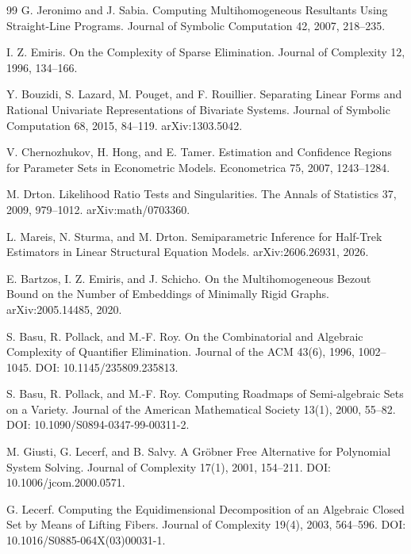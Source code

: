 \documentclass{article}
\begin{document}
\begin{thebibliography}{99}
   G. Jeronimo and J. Sabia. Computing Multihomogeneous Resultants Using Straight-Line Programs. Journal of Symbolic Computation 42, 2007, 218--235.

   I. Z. Emiris. On the Complexity of Sparse Elimination. Journal of Complexity 12, 1996, 134--166.

   Y. Bouzidi, S. Lazard, M. Pouget, and F. Rouillier. Separating Linear Forms and Rational Univariate Representations of Bivariate Systems. Journal of Symbolic Computation 68, 2015, 84--119. arXiv:1303.5042.

   V. Chernozhukov, H. Hong, and E. Tamer. Estimation and Confidence Regions for Parameter Sets in Econometric Models. Econometrica 75, 2007, 1243--1284.

   M. Drton. Likelihood Ratio Tests and Singularities. The Annals of Statistics 37, 2009, 979--1012. arXiv:math/0703360.

   L. Mareis, N. Sturma, and M. Drton. Semiparametric Inference for Half-Trek Estimators in Linear Structural Equation Models. arXiv:2606.26931, 2026.

   E. Bartzos, I. Z. Emiris, and J. Schicho. On the Multihomogeneous Bezout Bound on the Number of Embeddings of Minimally Rigid Graphs. arXiv:2005.14485, 2020.

   S. Basu, R. Pollack, and M.-F. Roy. On the Combinatorial and Algebraic Complexity of Quantifier Elimination. Journal of the ACM 43(6), 1996, 1002–1045. DOI: 10.1145/235809.235813.

   S. Basu, R. Pollack, and M.-F. Roy. Computing Roadmaps of Semi-algebraic Sets on a Variety. Journal of the American Mathematical Society 13(1), 2000, 55–82. DOI: 10.1090/S0894-0347-99-00311-2.

   M. Giusti, G. Lecerf, and B. Salvy. A Gröbner Free Alternative for Polynomial System Solving. Journal of Complexity 17(1), 2001, 154–211. DOI: 10.1006/jcom.2000.0571.

   G. Lecerf. Computing the Equidimensional Decomposition of an Algebraic Closed Set by Means of Lifting Fibers. Journal of Complexity 19(4), 2003, 564–596. DOI: 10.1016/S0885-064X(03)00031-1.

\end{thebibliography}
\end{document}
